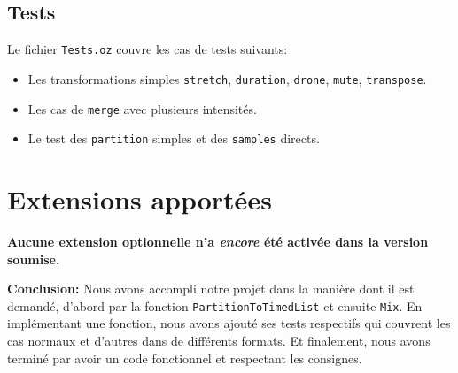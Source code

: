 \documentclass[a4paper,11pt]{article}
\begin{document}
\subsection*{Tests}
Le fichier \texttt{Tests.oz} couvre les cas de tests suivants:
\begin{itemize}
    \item Les transformations simples \texttt{stretch}, \texttt{duration}, \texttt{drone}, \texttt{mute}, \texttt{transpose}.
    \item Les cas de \texttt{merge} avec plusieurs intensités.
    \item Le test des \texttt{partition} simples et des \texttt{samples} directs.
\end{itemize}

\section{Extensions apportées}

\textbf{Aucune extension optionnelle n'a \textit{encore} été activée dans la version soumise.}

\vspace{0.5cm}
\noindent \textbf{Conclusion:}
\newline
Nous avons accompli notre projet dans la manière dont il est demandé, d'abord par la fonction \texttt{PartitionToTimedList} et ensuite \texttt{Mix}. En implémentant une fonction, nous avons ajouté ses tests respectifs qui couvrent les cas normaux et d'autres dans de différents formats. Et finalement, nous avons terminé par avoir un code fonctionnel et respectant les consignes.
\end{document}
